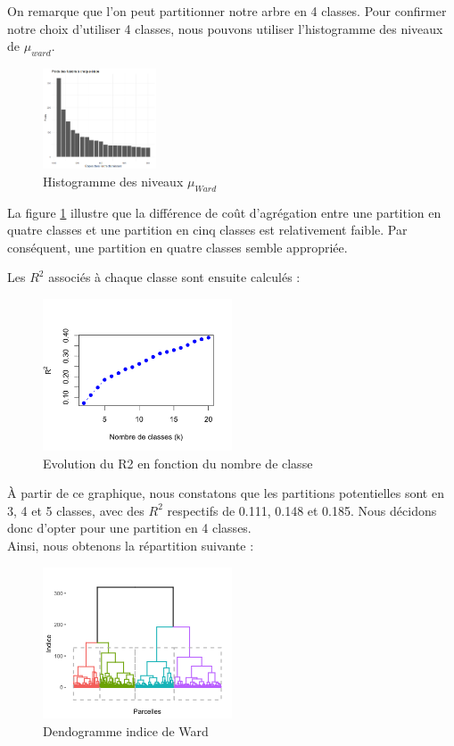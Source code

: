 \documentclass{article}
\begin{document}
On remarque que l'on peut partitionner notre arbre en 4 classes.
Pour confirmer notre choix d’utiliser 4 classes, nous pouvons utiliser l’histogramme des niveaux de $\mu_{ward}$.
\begin{figure}[H]
    \centering
    \includegraphics[width=0.3\textwidth]{histoward.png}
    \caption{Histogramme des niveaux $\mu_{Ward}$}
    \label{fig:HWard} 
\end{figure}

La figure \ref{fig:HWard} illustre que la différence de coût d'agrégation entre une partition en quatre classes et une partition en cinq classes est relativement faible. Par conséquent, une partition en quatre classes semble appropriée. 

Les \( R^2 \) associés à chaque classe sont ensuite calculés :

\begin{figure}[H]
    \centering
    \includegraphics[width=0.5\textwidth]{R222.png}
    \caption{Evolution du R2 en fonction du nombre de classe}
    \label{fig:EvolR2} 
\end{figure}
À partir de ce graphique, nous constatons que les partitions potentielles sont en 3, 4 et 5 classes, avec des \( R^2 \) respectifs de 0.111, 0.148 et 0.185. Nous décidons donc d'opter pour une partition en 4 classes.
\\
Ainsi, nous obtenons la répartition suivante :
\begin{figure}[H]
    \centering
    \includegraphics[width=0.5\textwidth]{wardcouleur.png}
    \caption{Dendogramme indice de Ward}
    \label{fig:Ward_couleur} 
\end{figure}
\end{document}
